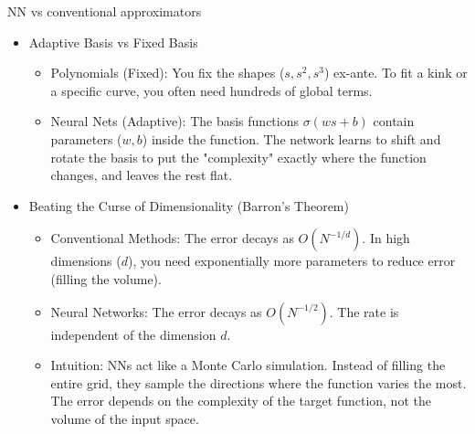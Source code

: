 \documentclass[aspectratio=169]{beamer}
\newcommand{\1}{\mathbf{1}}
\begin{document}
\begin{frame}{NN vs conventional approximators}
    \small

    \begin{itemize}
        \item Adaptive Basis vs Fixed Basis
        \begin{itemize}
            \item Polynomials (Fixed): You fix the shapes ($s, s^2, s^3$) ex-ante. To fit a kink or a specific curve, you often need hundreds of global terms.
            \item Neural Nets (Adaptive): The basis functions $\sigma(w s + b)$ contain parameters ($w, b$) inside the function. The network learns to shift and rotate the basis to put the "complexity" exactly where the function changes, and leaves the rest flat.
        \end{itemize}

        \item Beating the Curse of Dimensionality (Barron's Theorem)
        \begin{itemize}
            \item Conventional Methods: The error decays as $O(N^{-1/d})$. In high dimensions ($d$), you need exponentially more parameters to reduce error (filling the volume).
            \item Neural Networks: The error decays as $O(N^{-1/2})$. The rate is independent of the dimension $d$. 
            \item Intuition: NNs act like a Monte Carlo simulation. Instead of filling the entire grid, they sample the directions where the function varies the most. The error depends on the complexity of the target function, not the volume of the input space.
        \end{itemize}
    \end{itemize}
\end{frame}
\end{document}

